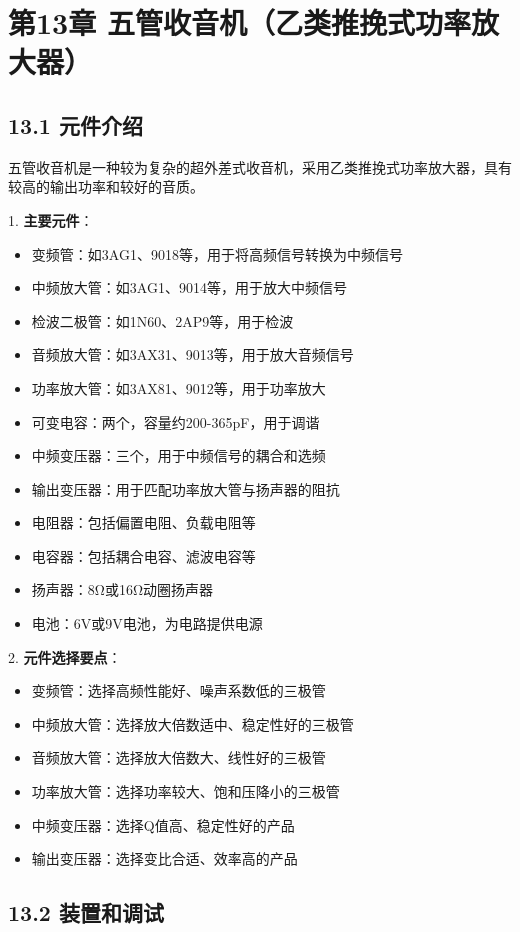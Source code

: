 \documentclass[12pt,UTF8]{ctexbook}
\begin{document}
\chapter*{第13章 五管收音机（乙类推挽式功率放大器）}
\section*{13.1 元件介绍}

五管收音机是一种较为复杂的超外差式收音机，采用乙类推挽式功率放大器，具有较高的输出功率和较好的音质。

1. \textbf{主要元件}：
   \begin{itemize}[leftmargin=3.5em]
   \item 变频管：如3AG1、9018等，用于将高频信号转换为中频信号
   \item 中频放大管：如3AG1、9014等，用于放大中频信号
   \item 检波二极管：如1N60、2AP9等，用于检波
   \item 音频放大管：如3AX31、9013等，用于放大音频信号
   \item 功率放大管：如3AX81、9012等，用于功率放大
   \item 可变电容：两个，容量约200-365pF，用于调谐
   \item 中频变压器：三个，用于中频信号的耦合和选频
   \item 输出变压器：用于匹配功率放大管与扬声器的阻抗
   \item 电阻器：包括偏置电阻、负载电阻等
   \item 电容器：包括耦合电容、滤波电容等
   \item 扬声器：8Ω或16Ω动圈扬声器
   \item 电池：6V或9V电池，为电路提供电源
   \end{itemize}

2. \textbf{元件选择要点}：
   \begin{itemize}[leftmargin=3.5em]
   \item 变频管：选择高频性能好、噪声系数低的三极管
   \item 中频放大管：选择放大倍数适中、稳定性好的三极管
   \item 音频放大管：选择放大倍数大、线性好的三极管
   \item 功率放大管：选择功率较大、饱和压降小的三极管
   \item 中频变压器：选择Q值高、稳定性好的产品
   \item 输出变压器：选择变比合适、效率高的产品
   \end{itemize}

\section*{13.2 装置和调试}
\end{document}
